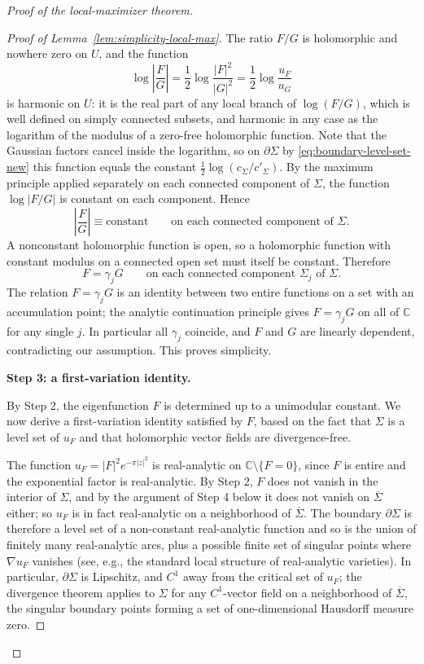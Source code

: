 \documentclass[a4paper,11pt,reqno]{amsart}
\numberwithin{equation}{section}
\theoremstyle{plain} %
\theoremstyle{definition} %
\theoremstyle{remark}
\newcommand{\C}{\mathbb{C}}
\begin{document}
\begin{proof}[Proof of the local-maximizer theorem]
\begin{proof}[Proof of Lemma~\ref{lem:simplicity-local-max}]
The ratio \(F/G\) is holomorphic and nowhere zero on \(U\), and the function
\[
\log \left|\frac{F}{G}\right|
=
\frac12 \log \frac{|F|^2}{|G|^2}
=
\frac12 \log \frac{u_F}{u_G}
\]
is harmonic on \(U\): it is the real part of any local branch of
\(\log(F/G)\), which is well defined on simply connected subsets, and harmonic
in any case as the logarithm of the modulus of a zero-free holomorphic
function. Note that the Gaussian factors cancel inside the logarithm, so on
\(\partial \Sigma\) by \eqref{eq:boundary-level-set-new} this function equals
the constant \(\frac12\log(c_\Sigma/c'_\Sigma)\). By the maximum principle
applied separately on each connected component of \(\Sigma\), the function
\(\log|F/G|\) is constant on each component. Hence
\[
\left|\frac{F}{G}\right| \equiv \text{constant}
\qquad \text{on each connected component of } \Sigma.
\]
A nonconstant holomorphic function is open, so a holomorphic function with
constant modulus on a connected open set must itself be constant. Therefore
\[
F=\gamma_j G
\qquad \text{on each connected component } \Sigma_j\text{ of } \Sigma.
\]
The relation \(F=\gamma_j G\) is an identity between two entire functions on a
set with an accumulation point; the analytic continuation principle gives
\(F=\gamma_j G\) on all of \(\C\) for any single \(j\). In particular all
\(\gamma_j\) coincide, and \(F\) and \(G\) are linearly dependent, contradicting
our assumption. This proves simplicity.

\medskip
\noindent
{\bf Step 3: a first-variation identity.}

By Step 2, the eigenfunction \(F\) is determined up to a unimodular constant.
We now derive a first-variation identity satisfied by \(F\), based on the fact
that \(\Sigma\) is a level set of \(u_F\) and that holomorphic vector fields are
divergence-free.

The function \(u_F=|F|^2e^{-\pi|z|^2}\) is real-analytic on
\(\C\setminus\{F=0\}\), since \(F\) is entire and the exponential factor is
real-analytic. By Step 2, \(F\) does not vanish in the interior of \(\Sigma\),
and by the argument of Step 4 below it does not vanish on \(\overline\Sigma\)
either; so \(u_F\) is in fact real-analytic on a neighborhood of
\(\overline\Sigma\). The boundary \(\partial\Sigma\) is therefore a level set
of a non-constant real-analytic function and so is the union of finitely many
real-analytic arcs, plus a possible finite set of singular points where
\(\nabla u_F\) vanishes (see, e.g., the standard local structure of
real-analytic varieties). In particular, \(\partial\Sigma\) is Lipschitz, and
\(C^1\) away from the critical set of \(u_F\); the divergence theorem applies
to \(\Sigma\) for any \(C^1\)-vector field on a neighborhood of
\(\overline\Sigma\), the singular boundary points forming a set of
one-dimensional Hausdorff measure zero.


\end{proof}
\end{proof}
\end{document}
